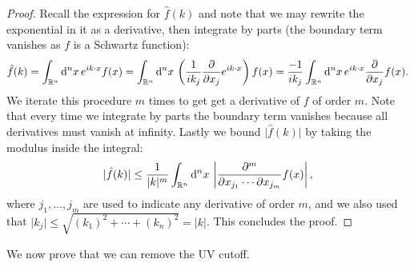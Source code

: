 \begin{proof}
	Recall the expression for $\hat{f}(k)$ and note that we may rewrite the exponential in it
	as a derivative, then integrate by parts (the boundary term vanishes as $f$ is a Schwartz
	function):
	\begin{align*}
		\hat{f}(k)
		= \int_{\mathbb{R}^n}\mathrm{d}^nx\, e^{ik\cdot x}f(x)
		= \int_{\mathbb{R}^n}\mathrm{d}^nx\, \left(\frac{1}{ik_j}\frac{\partial}{\partial x_j}e^{ik\cdot x}\right)f(x)
		= \frac{-1}{ik_j}\int_{\mathbb{R}^n}\mathrm{d}^nx\,e^{ik\cdot x} \frac{\partial}{\partial x_j}f(x).
	\end{align*}
	We iterate this procedure $m$ times to get get a derivative of $f$ of order $m$. Note that
	every time we integrate by parts the boundary term vanishes because all derivatives must
	vanish at infinity. Lastly we bound $\vert\hat{f}(k)\vert$ by taking the modulus inside
	the integral:
	\begin{align*}
		\vert\hat{f}(k)\vert \leq
		\frac{1}{\vert k\vert^m}\int_{\mathbb{R}^n}\mathrm{d}^nx\, \left\vert\frac{\partial^m}{\partial x_{j_1}\cdots\partial x_{j_m}}f(x)\right\vert,
	\end{align*}
	where $j_1,\ldots,j_m$ are used to indicate any derivative of order $m$, and we also used
	that $\vert k_j\vert\leq\sqrt{(k_1)^2+\cdots+(k_n)^2}=\vert k\vert$. This concludes the
	proof.
\end{proof}

We now prove that we can remove the UV cutoff.

